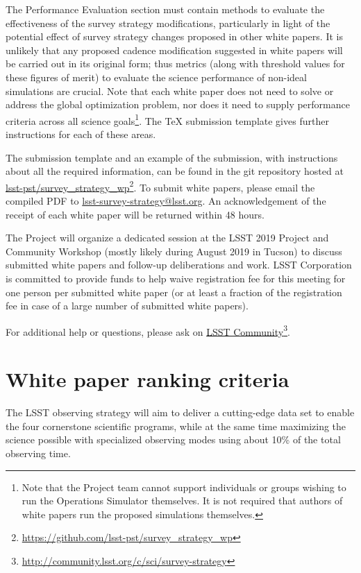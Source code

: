 \documentclass[DM,toc,usenatbib]{lsstdoc}
\begin{document}
The Performance Evaluation section must contain methods to evaluate the effectiveness of the survey strategy modifications, particularly in light of the potential effect of survey strategy changes proposed in other white papers. It is unlikely that any proposed cadence modification suggested in white papers will be carried out in its original form; thus metrics (along with threshold values for these figures of merit) to evaluate the science performance of non-ideal simulations are crucial.  Note that each white paper does not need to solve or address the global optimization problem, nor does it need to supply performance criteria across all science goals\footnote{Note that 
the Project team cannot support individuals or groups wishing to run the Operations Simulator themselves. It is not required that authors of white papers run the proposed simulations themselves.}. The TeX submission template gives further instructions for each of these areas.

The submission template and an example of the submission, with instructions about
all the required information, can be found in the git repository hosted at \href{https://github.com/lsst-pst/survey_strategy_wp}{lsst-pst/survey\_strategy\_wp}\footnote{\url{https://github.com/lsst-pst/survey_strategy_wp}}.
To submit white papers, please email the compiled PDF to \href{lsst-survey-strategy@lsst.org}{lsst-survey-strategy@lsst.org}. An acknowledgement
of the receipt of each white paper will be returned within 48 hours.

The Project will organize a dedicated session at the LSST 2019 Project and Community Workshop
(mostly likely during August 2019 in Tucson) to discuss submitted white papers and follow-up
deliberations and work. LSST Corporation is committed to provide funds to help waive registration
fee for this meeting for one person per submitted white paper (or at least a fraction of the registration 
fee in case of a large number of submitted white papers). 

For additional help or questions, please ask on \href{https://community.lsst.org/c/sci}{LSST Community}\footnote{\url{http://community.lsst.org/c/sci/survey-strategy}}. 


\section{White paper ranking criteria \label{sec:ranking}} 

The LSST observing strategy will aim to deliver a cutting-edge data set to enable
the four cornerstone scientific programs, while at the same time maximizing the 
science possible with specialized observing modes using about 10\% of the total observing time. 
\end{document}
